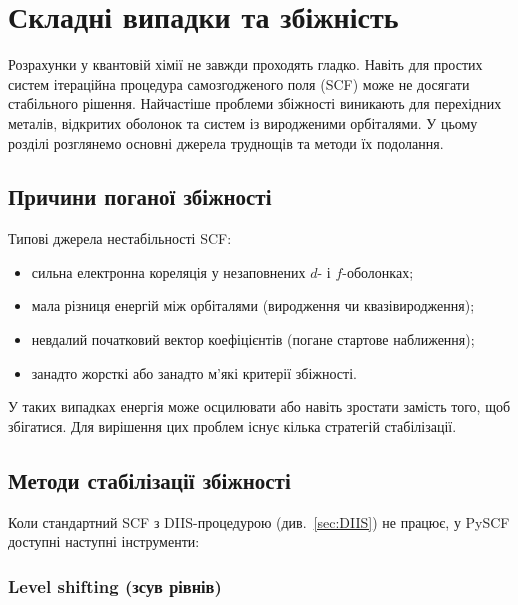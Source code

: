 

\section{Складні випадки та збіжність}\label{sec:convergence}

Розрахунки у квантовій хімії не завжди проходять гладко. Навіть для простих систем ітераційна процедура самозгодженого поля (SCF) може не досягати стабільного рішення.
Найчастіше проблеми збіжності виникають для перехідних металів, відкритих оболонок та систем із виродженими орбіталями.
У цьому розділі розглянемо основні джерела труднощів та методи їх подолання.

\subsection{Причини поганої збіжності}

Типові джерела нестабільності SCF:
\begin{itemize}
  \item сильна електронна кореляція у незаповнених $d$- і $f$-оболонках;
  \item мала різниця енергій між орбіталями (виродження чи квазівиродження);
  \item невдалий початковий вектор коефіцієнтів (погане стартове наближення);
  \item занадто жорсткі або занадто м'які критерії збіжності.
\end{itemize}

У таких випадках енергія може осцилювати або навіть зростати замість того, щоб збігатися. Для вирішення цих проблем існує кілька стратегій стабілізації.

\subsection{Методи стабілізації збіжності}

Коли стандартний SCF з DIIS-процедурою (див.~\ref{sec:DIIS}) не працює, у PySCF доступні наступні інструменти:

\subsubsection{Level shifting (зсув рівнів)}

